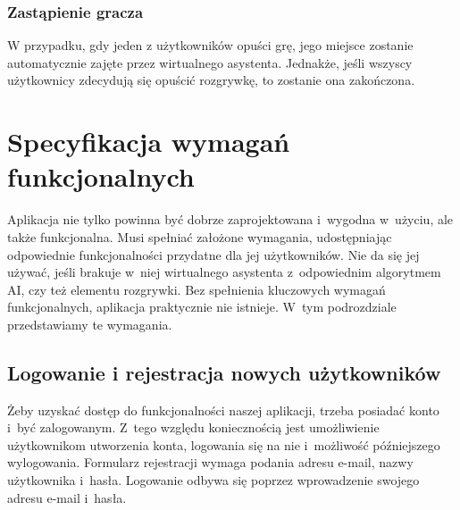 \FloatBarrier


\subsubsection{Zastąpienie gracza}
W przypadku, gdy jeden z użytkowników opuści grę, jego miejsce zostanie automatycznie
zajęte przez wirtualnego asystenta. Jednakże, jeśli wszyscy użytkownicy
zdecydują się opuścić rozgrywkę, to zostanie ona zakończona.






\section{Specyfikacja wymagań funkcjonalnych}

Aplikacja nie tylko powinna być dobrze zaprojektowana i~wygodna
w~użyciu, ale także funkcjonalna. Musi spełniać założone wymagania,
udostępniając odpowiednie funkcjonalności przydatne dla
jej użytkowników. Nie da się jej używać, jeśli brakuje w~niej
wirtualnego asystenta z~odpowiednim
algorytmem AI, czy też elementu
rozgrywki. Bez spełnienia kluczowych wymagań funkcjonalnych,
aplikacja praktycznie nie istnieje. W~tym podrozdziale przedstawiamy
te wymagania.


\subsection{Logowanie i rejestracja nowych użytkowników}
Żeby uzyskać dostęp do funkcjonalności naszej aplikacji, trzeba
posiadać konto i~być zalogowanym. Z~tego względu koniecznością
jest umożliwienie użytkownikom utworzenia konta, logowania się na
nie i~możliwość późniejszego wylogowania. Formularz rejestracji wymaga
podania adresu e-mail, nazwy użytkownika i~hasła. Logowanie odbywa się
poprzez wprowadzenie swojego adresu e-mail i~hasła.


